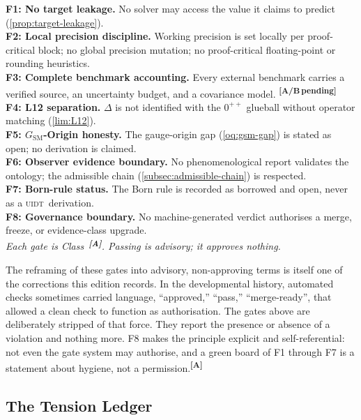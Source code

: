 \documentclass[12pt,a4paper,twoside]{article}
\theoremstyle{plain}
\theoremstyle{definition}
\theoremstyle{remark}
\newcommand{\UIDT}{\textsc{uidt}}
\newcommand{\catmark}[1]{\textsuperscript{\textsf{\textbf{[#1]}}}}
\begin{document}
\begin{governancebox}
\textbf{F1: No target leakage.} No solver may access the value it claims to
predict (\cref{prop:target-leakage}).\\[0.3em]
\textbf{F2: Local precision discipline.} Working precision is set locally per proof-critical block; no global precision mutation; no proof-critical
floating-point or rounding heuristics.\\[0.3em]
\textbf{F3: Complete benchmark accounting.} Every external benchmark carries a
verified source, an uncertainty budget, and a covariance model. \catmark{A/B\,pending}\\[0.3em]
\textbf{F4: L12 separation.} $\Delta$ is not identified with the $0^{++}$
glueball without operator matching (\cref{lim:L12}).\\[0.3em]
\textbf{F5: $G_{\mathrm{SM}}$-Origin honesty.} The gauge-origin gap
(\cref{oq:gsm-gap}) is stated as open; no derivation is claimed.\\[0.3em]
\textbf{F6: Observer evidence boundary.} No phenomenological report validates the ontology; the admissible chain (\cref{subsec:admissible-chain}) is
respected.\\[0.3em]
\textbf{F7: Born-rule status.} The Born rule is recorded as borrowed and
open, never as a \UIDT\ derivation.\\[0.3em]
\textbf{F8: Governance boundary.} No machine-generated verdict authorises a
merge, freeze, or evidence-class upgrade.\\[0.3em]
\emph{Each gate is Class~\catmark{A}. Passing is advisory; it approves nothing.}
\end{governancebox}

\noindent The reframing of these gates into advisory, non-approving terms is itself one of the corrections this edition records. In the developmental history, automated checks sometimes carried language, ``approved,'' ``pass,'' ``merge-ready'', that allowed a clean check to function as authorisation. The gates above are deliberately stripped of that force. They report the presence or absence of a violation and nothing more. F8 makes the principle explicit and self-referential: not even the gate system may authorise, and a green board of F1 through F7 is a statement about hygiene, not a permission.\catmark{A}

\subsection{The Tension Ledger}
\label{sec:tension-ledger}
\end{document}
